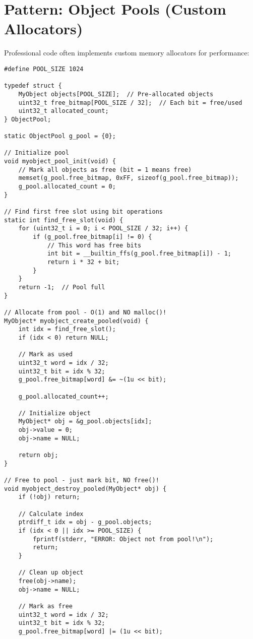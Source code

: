 \section{Pattern: Object Pools (Custom Allocators)}

Professional code often implements custom memory allocators for performance:

\begin{lstlisting}
#define POOL_SIZE 1024

typedef struct {
    MyObject objects[POOL_SIZE];  // Pre-allocated objects
    uint32_t free_bitmap[POOL_SIZE / 32];  // Each bit = free/used
    uint32_t allocated_count;
} ObjectPool;

static ObjectPool g_pool = {0};

// Initialize pool
void myobject_pool_init(void) {
    // Mark all objects as free (bit = 1 means free)
    memset(g_pool.free_bitmap, 0xFF, sizeof(g_pool.free_bitmap));
    g_pool.allocated_count = 0;
}

// Find first free slot using bit operations
static int find_free_slot(void) {
    for (uint32_t i = 0; i < POOL_SIZE / 32; i++) {
        if (g_pool.free_bitmap[i] != 0) {
            // This word has free bits
            int bit = __builtin_ffs(g_pool.free_bitmap[i]) - 1;
            return i * 32 + bit;
        }
    }
    return -1;  // Pool full
}

// Allocate from pool - O(1) and NO malloc()!
MyObject* myobject_create_pooled(void) {
    int idx = find_free_slot();
    if (idx < 0) return NULL;

    // Mark as used
    uint32_t word = idx / 32;
    uint32_t bit = idx % 32;
    g_pool.free_bitmap[word] &= ~(1u << bit);

    g_pool.allocated_count++;

    // Initialize object
    MyObject* obj = &g_pool.objects[idx];
    obj->value = 0;
    obj->name = NULL;

    return obj;
}

// Free to pool - just mark bit, NO free()!
void myobject_destroy_pooled(MyObject* obj) {
    if (!obj) return;

    // Calculate index
    ptrdiff_t idx = obj - g_pool.objects;
    if (idx < 0 || idx >= POOL_SIZE) {
        fprintf(stderr, "ERROR: Object not from pool!\n");
        return;
    }

    // Clean up object
    free(obj->name);
    obj->name = NULL;

    // Mark as free
    uint32_t word = idx / 32;
    uint32_t bit = idx % 32;
    g_pool.free_bitmap[word] |= (1u << bit);


\end{lstlisting}
